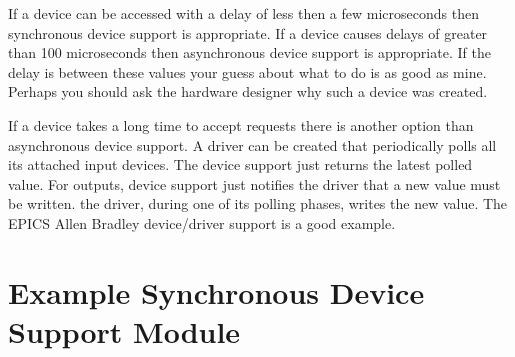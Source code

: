 If a device can be accessed with a delay of less then a few microseconds then synchronous device support is appropriate. 
If a device causes delays of greater than 100 microseconds then asynchronous device support is appropriate. If the delay is 
between these values your guess about what to do is as good as mine. Perhaps you should ask the hardware designer why 
such a device was created.

If a device takes a long time to accept requests there is another option than asynchronous device support. A driver can be 
created that periodically polls all its attached input devices. The device support just returns the latest polled value. For 
outputs, device support just notifies the driver that a new value must be written. the driver, during one of its polling 
phases, writes the new value. The EPICS Allen Bradley device/driver support is a good example.

\section{Example Synchronous Device Support Module}

